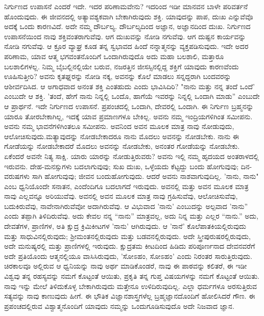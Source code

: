 ನಿರ್ಗುಣದ ಉಪಾಸನೆ ಎಂದರೆ ಇದೇ. ಇದರ ಪರಿಣಾಮವೇನು? ಇದರಿಂದ ಇಡೀ ಮಾನವನ ಬಾಳೇ ಪರಿವರ್ತನೆ ಹೊಂದುವುದು. ಈ ಜೀವನದಲ್ಲಿ ಅತ್ಯಾವಶ್ಯಕವಾಗಿ ಬೇಕಾಗಿರುವುದು ಶಕ್ತಿ. ಯಾವುದನ್ನು ಪಾಪ, ದುಃಖ ಎನ್ನುವೆವೊ ಅದಕ್ಕೆ ಒಂದು ಕಾರಣವಿದೆ. ಅದೇ ನಮ್ಮ ದೌರ್ಬಲ್ಯ. ದೌರ್ಬಲ್ಯದಿಂದ ಅಜ್ಞಾನ, ಅಜ್ಞಾನದಿಂದ ದುಃಖ. ನಿರ್ಗುಣದ ಉಪಾಸನೆಯಿಂದ ನಾವು ಶಕ್ತಿವಂತರಾಗುವೆವು. ಆಗ ದುಃಖವನ್ನು ನೋಡಿ ನಗುವೆವು. ಆಗ ದುಷ್ಟನ ಕಾರ್ಯವನ್ನು ನೋಡಿ ನಗುವೆವು. ಆ ಕ್ರೂರ ವ್ಯಾಘ್ರ ಕೂಡ ತನ್ನ ಸ್ವಭಾವದ ಹಿಂದೆ ನನ್ನಾತ್ಮನನ್ನು ವ್ಯಕ್ತಪಡಿಸುವುದು. ಇದೇ ಅದರ ಪರಿಣಾಮ, ಯಾವ ಆತ್ಮ ಭಗವಂತನೊಂದಿಗೆ ಒಂದಾಗಿರುವುದೊ ಅದು ಮಹಾ ಬಲಶಾಲಿ, ಮತ್ತಾರೂ ಬಲಶಾಲಿಗಳಲ್ಲ. ನಿಮ್ಮ ಬೈಬಲ್ಲಿನಲ್ಲಿಯೇ ಬರುವ, ನಜರತ್ತಿನ ಜೀಸಸ್ಸಿನಲ್ಲಿದ್ದ ಶಕ್ತಿಗೆ ಯಾವುದು ಕಾರಣವೆಂದು ಊಹಿಸುತ್ತೀರಿ? ಅವನು ಕೃತಘ್ನರನ್ನು ನೋಡಿ ನಕ್ಕ, ಅವನನ್ನು ಕೊಲೆ ಮಾಡಲು ಸನ್ನದ್ದರಾಗಿ ಬಂದವರನ್ನು ಆಶೀರ್ವದಿಸಿದ. ಆ ಅಗಾಧವಾದ ಅನಂತ ಶಕ್ತಿ ಎಂತಹುದು ಎಂದು ಭಾವಿಸಿದಿರಿ? "ನಾನು ಮತ್ತು ನನ್ನ ತಂದೆ ಒಂದೆ' ಎಂಬುದೇ ಆ ಶಕ್ತಿ. 'ತಂದೆ, ಹೇಗೆ ನಾನು ನಿನ್ನಲ್ಲಿ ಒಂದೊ, ಹಾಗೆಯೆ ಇವರನ್ನು ನಿನ್ನಲ್ಲಿ ಒಂದಾಗಿ ಮಾಡು'' ಎಂಬುದೇ ಆ ಪ್ರಾರ್ಥನೆ. ಇದೇ ನಿರ್ಗುಣದ ಉಪಾಸನೆ. ಪ್ರಪಂಚದಲ್ಲಿ ಒಂದಾಗಿ, ದೇವರಲ್ಲಿ ಒಂದಾಗಿ. ಈ ನಿರ್ಗುಣ ಬ್ರಹ್ಮನನ್ನು ಯಾರೂ ತೋರಬೇಕಾಗಿಲ್ಲ, ಇದಕ್ಕೆ ಯಾವ ಪ್ರಮಾಣಗಳೂ ಬೇಕಿಲ್ಲ. ಅವನು ನಮ್ಮ ಇಂದ್ರಿಯಗಳಿಗಿಂತ ಸಮೀಪನು. ಅವನು ನಮ್ಮ ಭಾವನೆಗಳಿಗಿಂತಲೂ ಸಮೀಪನು. ಅವನಿಂದ ಅವನ ಮೂಲಕ ಮಾತ್ರ ನಾವು ನೋಡುವುದು, ಆಲೋಚಿಸುವುದು.\break ಮತ್ಯಾವುದನ್ನು ನೋಡಬೇಕಾದರೂ ನಾನು ಮೊದಲು ಅವನನ್ನು ನೋಡಬೇಕು. ನಾನು ಈ ಗೋಡೆಯನ್ನು ನೋಡಬೇಕಾದರೆ ಮೊದಲು ಅವನನ್ನು ನೋಡಬೇಕು, ಅನಂತರ ಗೋಡೆಯನ್ನು ನೋಡಬೇಕು. ಏಕೆಂದರೆ ಅವನೇ ನಿತ್ಯ ಸಾಕ್ಷಿ. ಯಾರು ಯಾರನ್ನು ನೋಡುತ್ತಿರುವರು? ಅವನು ಇಲ್ಲಿ ನಮ್ಮ ಹೃದಯದ ಅಂತರಾಳದಲ್ಲಿ ಇರುವನು. ದೇಹ-ಮನಸ್ಸುಗಳು ಬದಲಾಗುವುವು; ಸುಖ ದುಃಖ, ಒಳ್ಳೆಯದು ಕೆಟ್ಟದ್ದು ಬಂದು ಹೋಗುವುವು; ದಿನ-ವರುಷಗಳು ಸಾಗಿ ಹೋಗುವುವು; ಜೀವನ ಬಂದುಹೋಗುವುದು. ಆದರೆ ಅವನು ನಾಶವಾಗುವುದಿಲ್ಲ. 'ನಾನು, ನಾನು" ಎಂಬ ಧ್ವನಿಯೊಂದೇ ಸನಾತನ, ಎಂದೆಂದಿಗೂ ಬದಲಾಗದೆ ಇರುವುದು. ಅವನಲ್ಲಿ ಮತ್ತು ಅವನ ಮೂಲಕ ಮಾತ್ರ ನಾವು ಎಲ್ಲವನ್ನೂ ಅರಿಯುವೆವು. ಅವನಲ್ಲಿ ಅವನ ಮೂಲಕ ಮಾತ್ರ ನಾವು ಗ್ರಹಿಸುವೆವು, ಆಲೋಚಿಸುವೆವು, ಬದುಕಿರುವೆವು, ನಾವೇನಾಗಿರುವೆವೋ ಅದಾಗಿರುವೆವು. ಆ ವಿಭುವಾದ 'ನಾನು' ಎಂಬುದನ್ನು ಅಲ್ಪವಾದ 'ನಾನು'' ಎಂದು ತಪ್ಪಾಗಿ ತಿಳಿದಿರುವೆವು. ಅದು ಕೇವಲ ನನ್ನ “ನಾನು” ಮಾತ್ರವಲ್ಲ, ಅದು ನಿನ್ನ ಮತ್ತು ಎಲ್ಲರ “ನಾನು.” ಅದು, ದೇವತೆಗಳ, ಪ್ರಾಣಿಗಳ, ಅತಿ ಕ್ಷುದ್ರ ಕ್ರಿಮಿಕೀಟಗಳ 'ನಾನು' ಆಗಿರುವುದು. ಆ 'ನಾನೆ' ಕೊಲೆಪಾತಕಿಯಲ್ಲಿರುವುದು ಮತ್ತು ಸಾಧುವಿನಲ್ಲಿರುವುದು; ಶ‍್ರೀಮಂತನಲ್ಲಿರುವುದು ಮತ್ತು ಬಡವನಲ್ಲಿರುವುದು. ಅದೇ ಸ್ತ್ರೀಪುರುಷರಲ್ಲಿರುವುದು, ಅದೇ ಮನುಷ್ಯರಲ್ಲಿ ಮತ್ತು ಪ್ರಾಣಿಗಳಲ್ಲಿ ಇರುವುದು. ಕ್ಷುದ್ರತಮ ಕೀಟದಿಂದ ಹಿಡಿದು ಪರಿಪೂರ್ಣನಾದ ದೇವನವರೆಗೆ ಅದೇ ಪ್ರತಿಯೊಂದು ಆತ್ಮನಲ್ಲಿಯೂ ವಾಸಿಸಿರುವುದು, 'ಸೋಽಹಂ, ಸೋಽಹಂ' ಎಂದು ನಿರಂತರ ಸಾರುತ್ತಿರುವುದು. ಚಿರಕಾಲವೂ ಅಲ್ಲಿರುವ ಆ ಧ್ವನಿಯನ್ನು ನಾವು ಅರ್ಥ ಮಾಡಿಕೊಂಡರೆ, ನಾವು ಈ ಪಾಠವನ್ನು ಕಲಿತರೆ, ಈ ಇಡೀ ವಿಶ್ವವು ತನ್ನ ರಹಸ್ಯವನ್ನು ನಮಗೆ ಕೊಟ್ಟಂತೆ ಆಯಿತು, ಪ್ರಕೃತಿ ತನ್ನ ಗುಪ್ತ ವಿಷಯಗಳನ್ನು ನಮಗೆ ಕೊಟ್ಟಂತೆ ಆಯಿತು. ನಾವು ಇನ್ನು ಮೇಲೆ ತಿಳಿದುಕೊಳ್ಳ ಬೇಕಾಗಿರುವುದು ಮತ್ತೇನೂ ಉಳಿದಿರುವುದಿಲ್ಲ. ಎಲ್ಲಾ ಧರ್ಮಗಳೂ ಅರಸುತ್ತಿರುವ ಸತ್ಯವನ್ನು ನಾವು ಕಾಣುವುದು ಹೀಗೆ. ಈ ಭೌತಿಕ ವಿಜ್ಞಾನಶಾಸ್ತ್ರಗಳೆಲ್ಲ ಬ್ರಹ್ಮಜ್ಞಾನದೊಂದಿಗೆ ಹೋಲಿಸಿದರೆ ಗೌಣ. ಈ ಪ್ರಪಂಚದಲ್ಲಿರುವ ವಿಶ್ವಾತ್ಮನೊಂದಿಗೆ ಯಾವುದು ನಮ್ಮನ್ನು ಒಂದುಗೂಡಿಸುವುದೊ ಅದೇ ನಿಜವಾದ ಜ್ಞಾನ.

